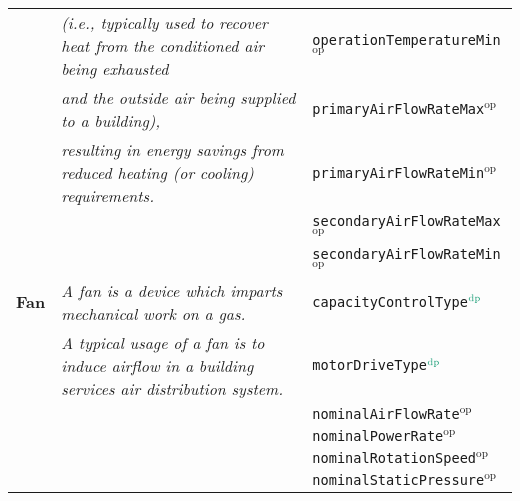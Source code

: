 {\begin{tabular}{lll}
                                  & \textit{(i.e., typically used to recover heat from the conditioned air being exhausted}                         & \texttt{operationTemperatureMin}$^\textrm{op}$   \\
                                  & \textit{and the outside air being supplied to a building),}                                                     & \texttt{primaryAirFlowRateMax}$^\textrm{op}$     \\
                                  & \textit{resulting in energy savings from reduced heating (or cooling) requirements.}                            & \texttt{primaryAirFlowRateMin}$^\textrm{op}$     \\
                                  &                                                                                                        & \texttt{secondaryAirFlowRateMax}$^\textrm{op}$   \\
                                  &                                                                                                        & \texttt{secondaryAirFlowRateMin}$^\textrm{op}$   \\ \midrule
\textbf{Fan}                      & \textit{A fan is a device which imparts mechanical work on a gas.}                                              & \texttt{capacityControlType}$\color{DarkGreen}^\textrm{dp}$       \\
                                  & \textit{A typical usage of a fan is to induce airflow in a building services air distribution system.}          & \texttt{motorDriveType}$\color{DarkGreen}^\textrm{dp}$            \\
                                  &                                                                                                        & \texttt{nominalAirFlowRate}$^\textrm{op}$        \\
                                  &                                                                                                        & \texttt{nominalPowerRate}$^\textrm{op}$          \\
                                  &                                                                                                        & \texttt{nominalRotationSpeed}$^\textrm{op}$      \\
                                  &                                                                                                        & \texttt{nominalStaticPressure}$^\textrm{op}$     \\

\end{tabular}}
